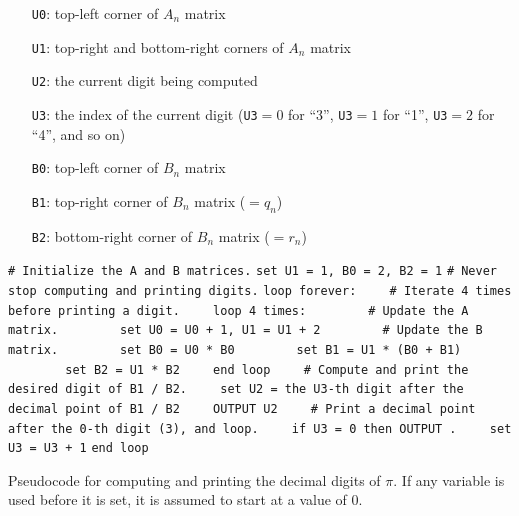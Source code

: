 \begin{itemize}
	\item[\texttt{U0}:] top-left corner of $A_n$ matrix
	
	\item[\texttt{U1}:] top-right and bottom-right corners of $A_n$ matrix
	
	\item[\texttt{U2}:] the current digit being computed
	
	\item[\texttt{U3}:] the index of the current digit (\texttt{U3}${} = 0$ for ``3'', \texttt{U3}${} = 1$ for ``1'', \texttt{U3}${} = 2$ for ``4'', and so on)\smallskip
	
	\item[\texttt{B0}:] top-left corner of $B_n$ matrix
	
	\item[\texttt{B1}:] top-right corner of $B_n$ matrix ($= q_n$)
	
	\item[\texttt{B2}:] bottom-right corner of $B_n$ matrix ($= r_n$)\smallskip
\end{itemize}

\begin{pseudocode}
	\begin{algorithmic}[1]\small
		\State\texttt{\# Initialize the A and B matrices.}
		\State\texttt{set U1 = 1, B0 = 2, B2 = 1}
		\Statex
		\State\texttt{\# Never stop computing and printing digits.}
		\State\texttt{loop forever:}
		\State\texttt{~~~~\# Iterate 4 times before printing a digit.}
		\State\texttt{~~~~loop 4 times:}
		\State\texttt{~~~~~~~~\# Update the A matrix.}
		\State\texttt{~~~~~~~~set U0 = U0 + 1,  U1 = U1 + 2}
		\Statex
		\State\texttt{~~~~~~~~\# Update the B matrix.}
		\State\texttt{~~~~~~~~set B0 = U0 * B0}
		\State\texttt{~~~~~~~~set B1 = U1 * (B0 + B1)}
		\State\texttt{~~~~~~~~set B2 = U1 * B2}
		\State\texttt{~~~~end loop}
		\Statex
		\State\texttt{~~~~\# Compute and print the desired digit of B1 / B2.}
		\State\texttt{~~~~set U2 = the U3-th digit after the decimal point of B1 / B2}
		\State\texttt{~~~~OUTPUT U2}
		\Statex
		\State\texttt{~~~~\# Print a decimal point after the 0-th digit (3), and loop.}
		\State\texttt{~~~~if U3 = 0 then OUTPUT .}
		\State\texttt{~~~~set U3 = U3 + 1}
		\State\texttt{end loop}
	\end{algorithmic}
	\caption{Pseudocode for computing and printing the decimal digits of $\pi$. If any variable is used before it is set, it is assumed to start at a value of $0$.}\label{alg:pseudocode_pi_calc}
\end{pseudocode}

